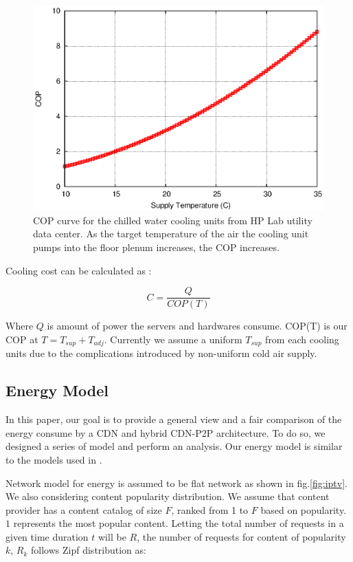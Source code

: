 \documentclass[JIP]{ipsj}
\begin{document}
\begin{figure}[thb]
\begin{center}
\includegraphics[scale=0.4]{graphs/cop.eps}
\end{center}
\caption{COP curve for the chilled water cooling units from HP Lab utility data center.
As the target temperature of the air the cooling unit pumps into the floor plenum increases, the COP increases.}
\label{fig:twotier}
\vspace{-2mm}
\end{figure} 

Cooling cost can be calculated as  \cite{moore2005making} :

\begin{equation}\label{eqn:cost}
C = \frac{Q}{COP(T)}
\end{equation}

Where $Q$ is amount of power the servers and hardwares consume.
COP(T) is our COP at $T=T_{sup}+T_{adj}$.
Currently we assume a uniform $T_{sup}$ from each cooling units due to the complications introduced by non-uniform cold air supply.


\subsection{Energy Model}\label{energy model}
In this paper, our goal is to provide a general view and a fair comparison of the energy consume by a CDN and hybrid CDN-P2P architecture. 
To do so, we designed a series of model and perform an analysis.
Our energy model is similar to the models used in \cite{5963557,baliga2011green,feldmann2010energy}.

Network model for energy is assumed to be flat network as shown in fig.\ref{fig:iptv}.
We also considering content popularity distribution.   
We assume that content provider has a content catalog of size $F$, ranked from 1 to $F$ based on popularity.   
$1$ represents the most popular content.
Letting the total number of requests in a given time duration $t$ will be $R$, the number of requests for content of popularity $k$, $R_k$ follows Zipf distribution as:
\end{document}
